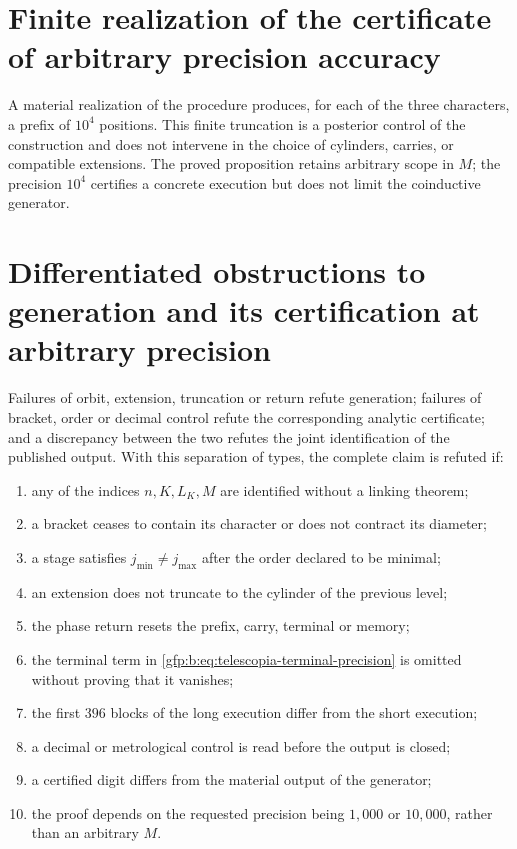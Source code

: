 \section{Finite realization of the certificate of arbitrary precision accuracy}

A material realization of the procedure produces, for each of the three characters, a prefix of \(10^4\) positions. This finite truncation is a posterior control of the construction and does not intervene in the choice of cylinders, carries, or compatible extensions. The proved proposition retains arbitrary scope in \(M\); the precision \(10^4\) certifies a concrete execution but does not limit the coinductive generator.

\section{Differentiated obstructions to generation and its certification at arbitrary precision}

\begin{remark}
Failures of orbit, extension, truncation or return refute generation;
failures of bracket, order or decimal control refute the corresponding
analytic certificate; and a discrepancy between the two refutes the
joint identification of the published output. With this separation of types,
the complete claim is refuted if:
\begin{enumerate}
 \item any of the indices \(n,K,L_K,M\) are identified without a
       linking theorem;
 \item a bracket ceases to contain its character or does not contract its diameter;
 \item a stage satisfies \(j_{\min}\ne j_{\max}\) after the order
       declared to be minimal;
 \item an extension does not truncate to the cylinder of the previous level;
 \item the phase return resets the prefix, carry, terminal or memory;
 \item the terminal term in
       \eqref{gfp:b:eq:telescopia-terminal-precision} is omitted without proving that it vanishes;
 \item the first \(396\) blocks of the long execution differ from the
       short execution;
 \item a decimal or metrological control is read before the output is closed;
 \item a certified digit differs from the material output of the generator;
 \item the proof depends on the requested precision being \(1,000\) or
       \(10,000\), rather than an arbitrary \(M\).
\end{enumerate}
\end{remark}
